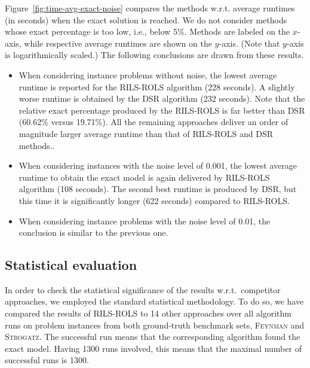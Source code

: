\documentclass{bmcart}
\begin{document}
Figure~\ref{fig:time-avg-exact-noise} compares the methods w.r.t. average runtimes (in seconds) when the exact solution is reached. We do not consider methods whose exact percentage is too low, i.e., below 5\%. Methods are labeled on the $x$-axis, while respective average runtimes are shown on the $y$-axis. (Note that $y$-axis is logarithmically scaled.) The following conclusions are drawn from these results.

\begin{itemize}
	\item When considering instance problems without noise, the lowest average runtime is reported for the \textsc{RILS}-\textsc{ROLS} algorithm (228 seconds). A slightly worse runtime is obtained by the \textsc{DSR} algorithm (232 seconds). Note that the relative exact percentage produced by the \textsc{RILS}-\textsc{ROLS} is far better than \textsc{DSR} (60.62\% versus 19.71\%). All the remaining approaches deliver an order of magnitude larger average runtime than that of \textsc{RILS}-\textsc{ROLS} and \textsc{DSR} methods..   
	\item  When considering instances with the noise level of 0.001, the lowest average runtime to obtain the exact model is again delivered by \textsc{RILS}-\textsc{ROLS} algorithm (108 seconds). The second best runtime is produced by \textsc{DSR}, but this time it is significantly longer (622 seconds) compared to \textsc{RILS-ROLS}. 
	\item When considering instance problems with the noise level of 0.01, the conclusion is similar to the previous one. 
\end{itemize}

\subsection{Statistical evaluation}

In order to check the statistical significance of the results w.r.t.\ competitor approaches, we employed the standard statistical methodology. To do so, we have compared the results of \textsc{RILS}-\textsc{ROLS} to 14 other approaches over all algorithm runs on problem instances from both ground-truth benchmark sets, \textsc{Feynman} and \textsc{Strogatz}. The successful run means that the corresponding algorithm found the exact model. Having 1300 runs involved, this means that the maximal number of successful runs is 1300. 
\end{document}
